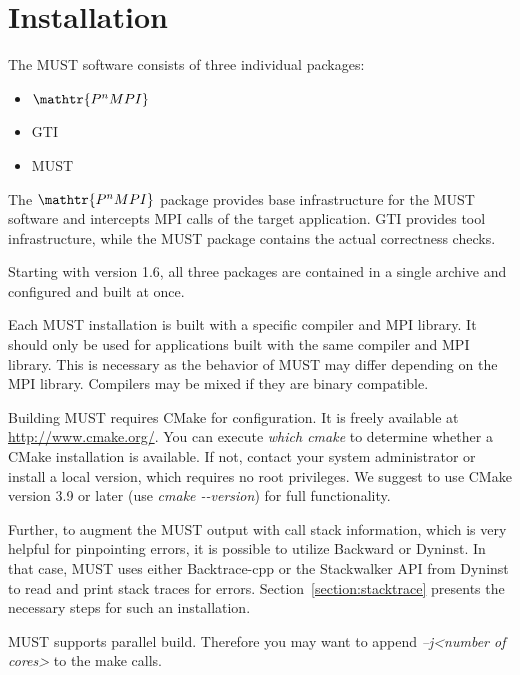 \documentclass[english]{scrartcl}
\newcommand{\pnmpi}{$\mathop{\mathtr{P^nMPI}}\nolimits$\xspace}
\begin{document}
\section{Installation}

The MUST software consists of three individual packages:
\begin{itemize}
  \item \pnmpi
  \item GTI
  \item MUST
\end{itemize}

The \pnmpi package provides base infrastructure for the MUST software and
intercepts MPI calls of the target application. GTI provides tool
infrastructure, while the MUST package contains the actual correctness checks.

Starting with version 1.6, all three packages are contained in a single archive and configured and built at once.

Each MUST installation is built with a specific compiler and MPI library. It
should only be used for applications built with the same compiler and MPI library. This is necessary as the behavior of MUST may differ
depending on the MPI library. Compilers may be mixed if they are binary
compatible.

Building MUST requires CMake for configuration. It is freely available at
\url{http://www.cmake.org/}. You can execute \emph{which cmake} to determine
whether a CMake installation is available. If not, contact your system
administrator or install a local version, which requires no root
privileges. We suggest to use CMake version 3.9 or later 
(use \emph{cmake \mbox{-{}-}version}) for full functionality.

Further, to augment the MUST output with call stack information, which
is very helpful for pinpointing errors, it is possible to utilize Backward or Dyninst. In
that case, MUST uses either Backtrace-cpp or the Stackwalker API from Dyninst to read and print stack traces for errors.
Section~\ref{section:stacktrace} presents the necessary steps for such an
installation.

MUST supports parallel build. Therefore you may want
to append \emph{\mbox{--}j\textless number of cores\textgreater} to the make
calls.
\end{document}

